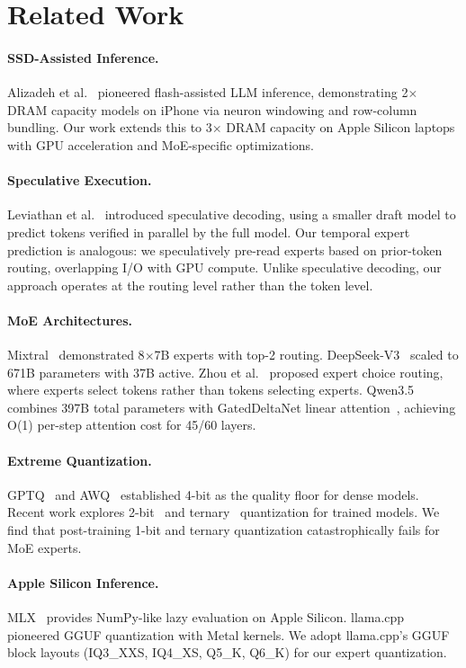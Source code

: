 \documentclass[11pt,twocolumn]{article}
\begin{document}
\section{Related Work}

\paragraph{SSD-Assisted Inference.} Alizadeh et al.~\cite{llminflash} pioneered flash-assisted LLM inference, demonstrating 2$\times$ DRAM capacity models on iPhone via neuron windowing and row-column bundling. Our work extends this to 3$\times$ DRAM capacity on Apple Silicon laptops with GPU acceleration and MoE-specific optimizations.

\paragraph{Speculative Execution.} Leviathan et al.~\cite{specdecoding} introduced speculative decoding, using a smaller draft model to predict tokens verified in parallel by the full model. Our temporal expert prediction is analogous: we speculatively pre-read experts based on prior-token routing, overlapping I/O with GPU compute. Unlike speculative decoding, our approach operates at the routing level rather than the token level.

\paragraph{MoE Architectures.} Mixtral~\cite{mixtral} demonstrated 8$\times$7B experts with top-2 routing. DeepSeek-V3~\cite{deepseek} scaled to 671B parameters with 37B active. Zhou et al.~\cite{expertchoice} proposed expert choice routing, where experts select tokens rather than tokens selecting experts. Qwen3.5~\cite{qwen3} combines 397B total parameters with GatedDeltaNet linear attention~\cite{deltanet}, achieving O(1) per-step attention cost for 45/60 layers.

\paragraph{Extreme Quantization.} GPTQ~\cite{gptq} and AWQ~\cite{awq} established 4-bit as the quality floor for dense models. Recent work explores 2-bit~\cite{quip} and ternary~\cite{bitnet} quantization for trained models. We find that post-training 1-bit and ternary quantization catastrophically fails for MoE experts.

\paragraph{Apple Silicon Inference.} MLX~\cite{mlx} provides NumPy-like lazy evaluation on Apple Silicon. llama.cpp~\cite{llamacpp} pioneered GGUF quantization with Metal kernels. We adopt llama.cpp's GGUF block layouts (IQ3\_XXS, IQ4\_XS, Q5\_K, Q6\_K) for our expert quantization.
\end{document}
